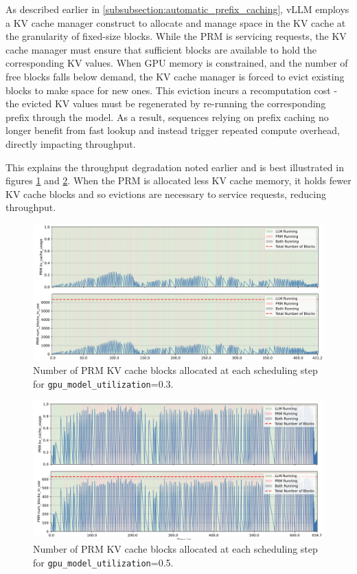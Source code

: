 \documentclass[12pt,twoside]{report}
\begin{document}
As described earlier in \ref{subsubsection:automatic_prefix_caching}, vLLM employs a KV cache manager construct to allocate and manage space in the KV cache at the granularity of fixed-size blocks. 
While the PRM is servicing requests, the KV cache manager must ensure that sufficient blocks are available to hold the corresponding KV values. 
When GPU memory is constrained, and the number of free blocks falls below demand, the KV cache manager is forced to evict existing blocks to make space for new ones. 
This eviction incurs a recomputation cost - the evicted KV values must be regenerated by re-running the corresponding prefix through the model. 
As a result, sequences relying on prefix caching no longer benefit from fast lookup and instead trigger repeated compute overhead, directly impacting throughput.

This explains the throughput degradation noted earlier and is best illustrated in figures \ref{fig:prm_block_usage_low} and \ref{fig:prm_block_usage_high}.
When the PRM is allocated less KV cache memory, it holds fewer KV cache blocks and so evictions are necessary to service requests, reducing throughput.

\begin{figure}[htbp]
  \centering
  \includegraphics[width=\textwidth]{figures/prm_block_usage_low.png}
  \caption{Number of PRM KV cache blocks allocated at each scheduling step for \texttt{gpu\_model\_utilization}=0.3.}
  \label{fig:prm_block_usage_low}
\end{figure}

\begin{figure}[htbp]
  \centering
  \includegraphics[width=\textwidth]{figures/prm_block_usage_high.png}
  \caption{Number of PRM KV cache blocks allocated at each scheduling step for \texttt{gpu\_model\_utilization}=0.5.}
  \label{fig:prm_block_usage_high}
\end{figure}
\end{document}

